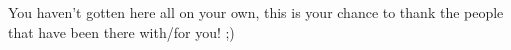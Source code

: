 \begin{acknowledgements}
You haven't gotten here all on your own, this is your chance to thank the people that have been there with/for you! ;)


\bigskip

\rightline{\VarPhdName}


\rightline{\textcolor{red}{Gothenburg, January 1st, 2025}}

\end{acknowledgements}